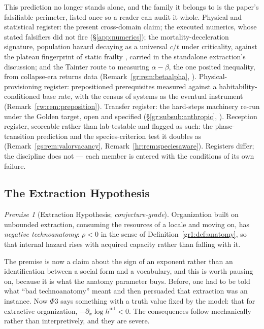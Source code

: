 \documentclass[11pt]{article}
\numberwithin{equation}{section}
\theoremstyle{plain}
\theoremstyle{definition}
\theoremstyle{remark}
\newtheorem{premise}{Premise}
\begin{document}
This prediction no longer stands alone, and the family it belongs to
is the paper's falsifiable perimeter, listed once so a reader can
audit it whole. Physical and statistical register: the present
cross-domain claim; the executed numerics, whose stated falsifiers
did not fire (\S\ref{app:numerics}); the mortality-deceleration
signature, population hazard decaying as a universal $c/t$ under
criticality, against the plateau fingerprint of static frailty
\cite{GG01}, carried in the standalone extraction's discussion;
and the Tainter route to measuring $\alpha-\beta$, the one posited
inequality, from collapse-era returns data
(Remark~\ref{gr:rem:betaalpha}, \cite{Tainter88}). Physical-provisioning
register: prepositioned prerequisites measured against a
habitability-conditioned base rate, with the census of systems as
the eventual instrument (Remark~\ref{rw:rem:preposition}). Transfer
register: the hard-steps machinery re-run under the Golden target,
open and specified (\S\ref{gr:subsub:anthropic}, \cite{SBSD21}).
Reception register, scoreable rather than lab-testable and flagged
as such: the phase-transition prediction and the species-criterion
test it doubles as (Remark~\ref{gs:rem:valorvacancy},
Remark~\ref{hr:rem:speciesaware}). Registers differ; the discipline
does not --- each member is entered with the conditions of its own
failure.

\subsection{The Extraction Hypothesis}\label{gr:sub:extraction}

\setcounter{premise}{2} %
\begin{premise}[Extraction Hypothesis; \emph{conjecture-grade}]
\label{gr:phi3}
Organization built on unbounded extraction, consuming the resources
of a locale and moving on, has \emph{negative technoanatomy}:
$\rho<0$ in the sense of Definition~\ref{gr1:def:anatomy}, so that
internal hazard rises with acquired capacity rather than falling with
it.
\end{premise}

The premise is now a claim about the sign of an exponent rather than an
identification between a social form and a vocabulary, and this is worth
pausing on, because it is what the anatomy parameter buys. Before, one
had to be told what ``bad technoanatomy'' meant and then persuaded that
extraction was an instance. Now $\Phi3$ says something with a truth
value fixed by the model: that for extractive organization,
$-\partial_x\log h^{\mathrm{int}}<0$. The consequences follow
mechanically rather than interpretively, and they are severe.
\end{document}

